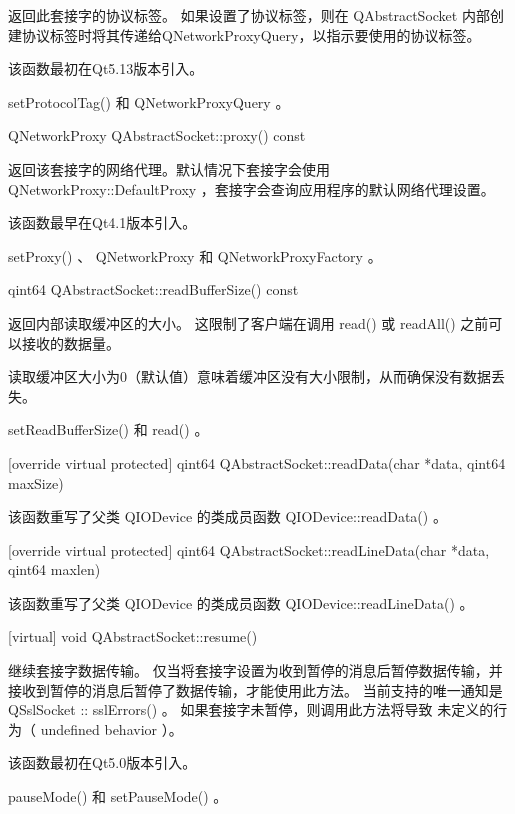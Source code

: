 返回此套接字的协议标签。 如果设置了协议标签，则在 QAbstractSocket 内部创建协议标签时将其传递给QNetworkProxyQuery，以指示要使用的协议标签。

该函数最初在Qt5.13版本引入。

\begin{seeAlso}
setProtocolTag() 和 QNetworkProxyQuery  。
\end{seeAlso}

QNetworkProxy QAbstractSocket::proxy() const

返回该套接字的网络代理。默认情况下套接字会使用 QNetworkProxy::DefaultProxy ，套接字会查询应用程序的默认网络代理设置。

该函数最早在Qt4.1版本引入。

\begin{seeAlso}
setProxy() 、 QNetworkProxy 和 QNetworkProxyFactory 。
\end{seeAlso}

qint64 QAbstractSocket::readBufferSize() const

返回内部读取缓冲区的大小。 这限制了客户端在调用 read() 或 readAll() 之前可以接收的数据量。

读取缓冲区大小为0（默认值）意味着缓冲区没有大小限制，从而确保没有数据丢失。

\begin{seeAlso}
setReadBufferSize() 和 read()  。
\end{seeAlso}

[override virtual protected] qint64 QAbstractSocket::readData(char
*data, qint64 maxSize)

该函数重写了父类 QIODevice 的类成员函数 QIODevice::readData() 。

[override virtual protected] qint64 QAbstractSocket::readLineData(char
*data, qint64 maxlen)

该函数重写了父类 QIODevice 的类成员函数 QIODevice::readLineData() 。

[virtual] void QAbstractSocket::resume()

继续套接字数据传输。 仅当将套接字设置为收到暂停的消息后暂停数据传输，并接收到暂停的消息后暂停了数据传输，才能使用此方法。 当前支持的唯一通知是 QSslSocket :: sslErrors() 。 如果套接字未暂停，则调用此方法将导致 未定义的行为（ undefined behavior ）。

该函数最初在Qt5.0版本引入。



\begin{seeAlso}
pauseMode() 和 setPauseMode() 。
\end{seeAlso}

